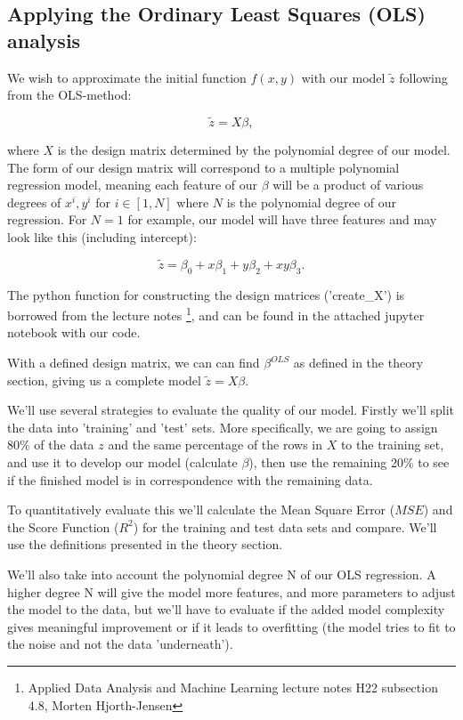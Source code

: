 \documentclass[reprint,english,notitlepage]{revtex4-1}  %
\begin{document}
\subsection{Applying the Ordinary Least Squares (OLS) analysis}
We wish to approximate the initial function $f(x, y)$ with our model $\tilde{z}$ following from the OLS-method:

$$\tilde{z} = X\beta,$$

where $X$ is the design matrix determined by the polynomial degree of our model. The form of our design matrix will correspond to a multiple polynomial regression model, meaning each feature of our $\beta$ will be a product of various degrees of $x^i, y^i$ for $i \in [1, N]$ where $N$ is the polynomial degree of our regression. For $N = 1$ for example, our model will have three features and may look like this (including intercept):

$$\tilde{z} = \beta_0 + x\beta_1 + y\beta_2 + xy\beta_3.$$

The python function for constructing the design matrices ('create\_X') is borrowed from the lecture notes \footnote{Applied Data Analysis and Machine Learning lecture notes H22 subsection 4.8, Morten Hjorth-Jensen}, and can be found in the attached jupyter notebook with our code.

With a defined design matrix, we can can find $\beta^{OLS}$ as defined in the theory section, giving us a complete model $\tilde{z} = X\beta$.

We'll use several strategies to evaluate the quality of our model. Firstly we'll split the data into 'training' and 'test' sets. More specifically, we are going to assign 80\% of the data $z$ and the same percentage of the rows in $X$ to the training set, and use it to develop our model (calculate $\beta$), then use the remaining 20\% to see if the finished model is in correspondence with the remaining data.

To quantitatively evaluate this we'll calculate the Mean Square Error ($MSE$) and the Score Function ($R^2$) for the training and test data sets and compare. We'll use the definitions presented in the theory section.

We'll also take into account the polynomial degree N of our OLS regression. A higher degree N will give the model more features, and more parameters to adjust the model to the data, but we'll have to evaluate if the added model complexity gives meaningful improvement or if it leads to overfitting (the model tries to fit to the noise and not the data 'underneath').
\end{document}
